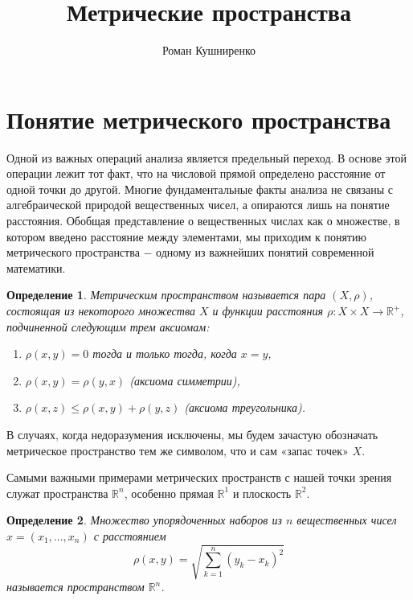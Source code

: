 \documentclass{article}
\title{Метрические пространства}
\author{Роман Кушниренко}
\newtheorem{definition}{Определение}[section]
\begin{document}

	\maketitle

	\section{Понятие метрического пространства}

Одной из важных операций анализа является предельный переход. В основе этой операции лежит тот факт, что на числовой прямой определено расстояние от одной точки до другой. Многие фундаментальные факты анализа не связаны с алгебраической природой вещественных чисел, а опираются лишь на понятие расстояния. Обобщая представление о вещественных числах как о множестве, в котором введено расстояние между элементами, мы приходим к понятию метрического пространства \(-\) одному из важнейших понятий современной математики.

\begin{definition}
Метрическим пространством называется пара \((X, \rho)\), состоящая из некоторого множества \(X\) и функции расстояния \(\rho : X \times X \to \mathbb{R^{+}}\), подчиненной следующим трем аксиомам:
\begin{enumerate}
    \item \(\rho(x, y) = 0\) тогда и только тогда, когда \(x = y\),
    \item \(\rho(x, y) = \rho(y, x)\) (аксиома симметрии),
    \item \(\rho(x, z) \leq \rho(x, y) + \rho(y, z)\) (аксиома треугольника).
\end{enumerate}
\end{definition}

В случаях, когда недоразумения исключены, мы будем зачастую обозначать метрическое пространство тем же символом, что и сам «запас точек» \(X\). \newline

Самыми важными примерами метрических пространств с нашей точки зрения служат пространства \(\mathbb{R}^n\), особенно прямая \(\mathbb{R}^1\) и плоскость \(\mathbb{R}^2\).

\begin{definition}
Множество упорядоченных наборов из \(n\) вещественных чисел \(x = (x_1, ..., x_n)\) с расстоянием
\[
\rho(x, y) = \sqrt{\sum_{k = 1}^{n}(y_k - x_k)^2}
\]
называется пространством \(\mathbb{R}^n\).
\end{definition}
\end{document}
